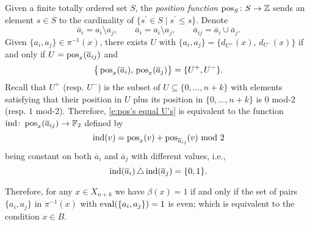 Given a finite totally ordered set $S$, the \textit{position function} $\operatorname{pos}_S \colon S \to \mathbb{Z}$ sends an element $s \in S$ to the cardinality of $\{s^\prime \in S \mid s^\prime \leq s\}$.
Denote
\begin{equation*}
\overline{a}_{i} = a_i \setminus a_j, \qquad
\overline{a}_{i} = a_i \setminus a_j, \qquad
\overline{a}_{ij} = \overline{a}_i \cup \overline{a}_j.
\end{equation*}
Given $\{a_i, a_j\} \in \pi^{-1}(x)$, there exists $U$ with $\{a_i, a_j\} = \{d_{U^+}(x),\, d_{U^-}(x)\}$
if and only if $U = \operatorname{pos}_{x}(\overline{a}_{ij})$ and
\begin{equation} \label{e:pos's equal U's}
\big\{\operatorname{pos}_{x}(\overline{a}_i),\, \operatorname{pos}_{x}(\overline{a}_j)\big\} = \{U^+, U^-\}.
\end{equation}
Recall that $U^+$ (resp. $U^-$) is the subset of $U \subseteq \{0, \dots, n+k\}$ with elements satisfying that their position in $U$ plus its position in $\{0, \dots, n+k\}$ is $0$ mod-2 (resp. $1$ mod-2).
Therefore, \eqref{e:pos's equal U's} is equivalent to the function $\mathrm{ind} \colon \operatorname{pos}_x(\overline{a}_{ij}) \to \mathbb{F}_2$ defined by
\begin{equation*}
\mathrm{ind}(v) = \operatorname{pos}_{x}(v) + \operatorname{pos}_{\overline{a}_{ij}}(v) \text{ mod }2
\end{equation*}
being constant on both $\overline{a}_i$ and $\overline{a}_j$ with different values, i.e., 
\begin{equation*}
\mathrm{ind}(\overline{a}_i) \operatorname{\triangle} \mathrm{ind}(\overline{a}_j) = \{0,1\}.
\end{equation*}

Therefore, for any $x \in X_{n+k}$ we have $\beta(x) = 1$ if and only if the set of pairs $\{a_i, a_j\}$ in $\pi^{-1}(x)$ with $\operatorname{eval}(\{a_i, a_j\}) = 1$ is even; which is equivalent to the condition $x \in B$.